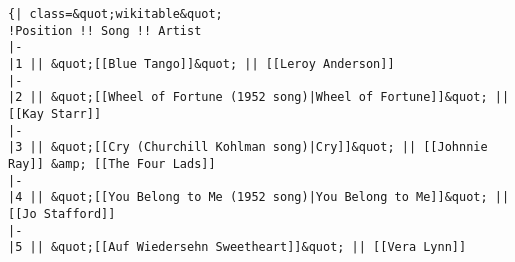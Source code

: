 \begin{lstlisting}[caption=Auszug eines Wikipedia-Artikel Downloads]
{| class=&quot;wikitable&quot;
!Position !! Song !! Artist
|-
|1 || &quot;[[Blue Tango]]&quot; || [[Leroy Anderson]]
|-
|2 || &quot;[[Wheel of Fortune (1952 song)|Wheel of Fortune]]&quot; || [[Kay Starr]]
|-
|3 || &quot;[[Cry (Churchill Kohlman song)|Cry]]&quot; || [[Johnnie Ray]] &amp; [[The Four Lads]]
|-
|4 || &quot;[[You Belong to Me (1952 song)|You Belong to Me]]&quot; || [[Jo Stafford]]
|-
|5 || &quot;[[Auf Wiedersehn Sweetheart]]&quot; || [[Vera Lynn]]
\end{lstlisting}